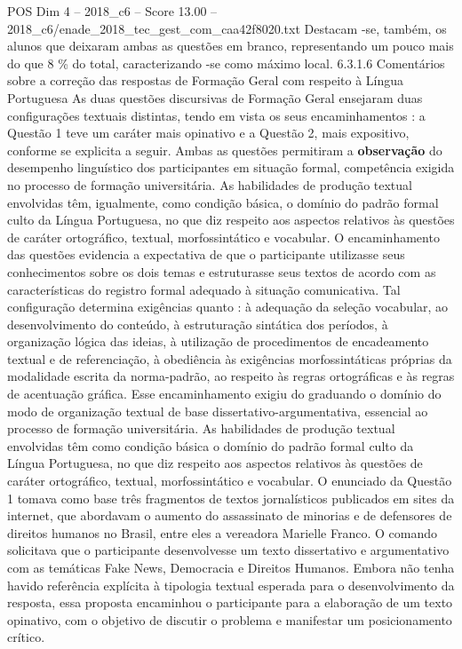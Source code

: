 \begin{textsample}{POS Dim 4 – 2018\_c6 – Score 13.00 – 2018\_c6/enade\_2018\_tec\_gest\_com\_caa42f8020.txt}
Destacam -se, também, os alunos que deixaram ambas as questões em branco, representando um pouco mais do que 8 \% do total, caracterizando -se como máximo local. 6.3.1.6 Comentários sobre a correção das respostas de Formação Geral com respeito à Língua Portuguesa As duas questões discursivas de Formação Geral ensejaram duas configurações textuais distintas, tendo em vista os seus encaminhamentos : a Questão 1 teve um caráter mais opinativo e a Questão 2, mais expositivo, conforme se explicita a seguir.
Ambas as questões permitiram a \textbf{observação} do desempenho linguístico dos participantes em situação formal, competência exigida no processo de formação universitária.
As habilidades de produção textual envolvidas têm, igualmente, como condição básica, o domínio do padrão formal culto da Língua Portuguesa, no que diz respeito aos aspectos relativos às questões de caráter ortográfico, textual, morfossintático e vocabular.
O encaminhamento das questões evidencia a expectativa de que o participante utilizasse seus conhecimentos sobre os dois temas e estruturasse seus textos de acordo com as características do registro formal adequado à situação comunicativa.
Tal configuração determina exigências quanto : à adequação da seleção vocabular, ao desenvolvimento do conteúdo, à estruturação sintática dos períodos, à organização lógica das ideias, à utilização de procedimentos de encadeamento textual e de referenciação, à obediência às exigências morfossintáticas próprias da modalidade escrita da norma-padrão, ao respeito às regras ortográficas e às regras de acentuação gráfica.
Esse encaminhamento exigiu do graduando o domínio do modo de organização textual de base dissertativo-argumentativa, essencial ao processo de formação universitária.
As habilidades de produção textual envolvidas têm como condição básica o domínio do padrão formal culto da Língua Portuguesa, no que diz respeito aos aspectos relativos às questões de caráter ortográfico, textual, morfossintático e vocabular.
O enunciado da Questão 1 tomava como base três fragmentos de textos jornalísticos publicados em sites da internet, que abordavam o aumento do assassinato de minorias e de defensores de direitos humanos no Brasil, entre eles a vereadora Marielle Franco.
O comando solicitava que o participante desenvolvesse um texto dissertativo e argumentativo com as temáticas Fake News, Democracia e Direitos Humanos.
Embora não tenha havido referência explícita à tipologia textual esperada para o desenvolvimento da resposta, essa proposta encaminhou o participante para a elaboração de um texto opinativo, com o objetivo de discutir o problema e manifestar um posicionamento crítico.

\end{textsample}
